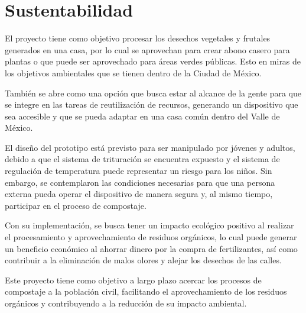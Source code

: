 \clearpage
\section{Sustentabilidad}

El proyecto tiene como objetivo procesar los desechos vegetales y frutales generados en una casa, por lo cual se aprovechan para crear abono casero para plantas o que puede ser aprovechado para áreas verdes públicas. Esto en miras de los objetivos ambientales que se tienen dentro de la Ciudad de México.

También se abre como una opción que busca estar al alcance de la gente para que se integre en las tareas de reutilización de recursos, generando un dispositivo que sea accesible y que se pueda adaptar en una casa común dentro del Valle de México.

El diseño del prototipo está previsto para ser manipulado por jóvenes y adultos, debido a que el sistema de trituración se encuentra expuesto y el sistema de regulación de temperatura puede representar un riesgo para los niños. Sin embargo, se contemplaron las condiciones necesarias para que una persona externa pueda operar el dispositivo de manera segura y, al mismo tiempo, participar en el proceso de compostaje.

Con su implementación, se busca tener un impacto ecológico positivo al realizar el procesamiento y aprovechamiento de residuos orgánicos, lo cual puede generar un beneficio económico al ahorrar dinero por la compra de fertilizantes, así como contribuir a la eliminación de malos olores y alejar los desechos de las calles.

Este proyecto tiene como objetivo a largo plazo acercar los procesos de compostaje a la población civil, facilitando el aprovechamiento de los residuos orgánicos y contribuyendo a la reducción de su impacto ambiental.